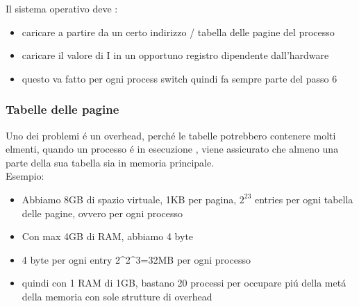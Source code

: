     Il sistema operativo deve :
    \begin{itemize}
        \item caricare a partire da un certo indirizzo / tabella delle pagine del processo
        \item caricare il valore di I in un opportuno registro dipendente dall'hardware
        \item questo va fatto per ogni process switch quindi fa sempre parte del passo 6
    \end{itemize}
    \subsubsection*{Tabelle delle pagine}
    Uno dei problemi é un overhead, perché le tabelle potrebbero contenere molti elmenti, quando un processo é in esecuzione
    , viene assicurato che almeno una parte della sua tabella sia in memoria principale. \\
    
    Esempio:
    \begin{itemize}
        \item Abbiamo 8GB di spazio virtuale, 1KB per pagina, \begin{math}2^23\end{math} entries per ogni tabella delle pagine, ovvero per ogni processo
        \item Con max 4GB di RAM, abbiamo 4 byte
        \item 4 byte per ogni entry 2^2^3=32MB per ogni processo
        \item quindi con 1 RAM di 1GB, bastano 20 processi per occupare piú della metá della memoria con sole strutture di
        overhead
    \end{itemize}
